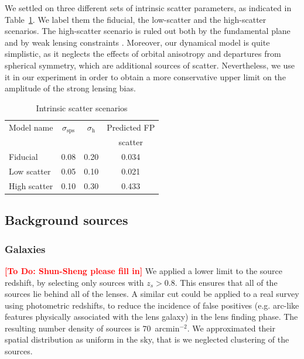 \documentclass{aa}
\def\Tref#1{Table~\ref{#1}\xspace}
\newcommand{\ale}[1]{\textcolor{red}{\textbf{[Ale: #1]}}}
\newcommand{\todo}[1]{\textcolor{red}{\textbf{[To Do: #1]}}}
\begin{document}
We settled on three different sets of intrinsic scatter parameters, as indicated in \Tref{tab:scatter}. We label them the fiducial, the low-scatter and the high-scatter scenarios.
The high-scatter scenario is ruled out both by the fundamental plane and by weak lensing constraints \citep{Son++22}. 
Moreover, our dynamical model is quite simplistic, as it neglects the effects of orbital anisotropy and departures from spherical symmetry, which are additional sources of scatter. 
Nevertheless, we use it in our experiment in order to obtain a more conservative upper limit on the amplitude of the strong lensing bias.
\begin{table}
\caption{Intrinsic scatter scenarios}
\label{tab:scatter}
\begin{tabular}{lccc}
\hline
\hline
Model name & $\sigma_{\mathrm{sps}}$ & $\sigma_{\mathrm{h}}$ & Predicted FP \\
 & & & scatter \\
\hline
Fiducial & 0.08 & 0.20 & 0.034 \\
Low scatter & 0.05 & 0.10 & 0.021 \\
High scatter & 0.10 & 0.30 & 0.433 \\
\end{tabular}
\end{table}

\subsection{Background sources}\label{ssec:sources}

\subsubsection{Galaxies}\label{ssub:extsources}

\todo{Shun-Sheng please fill in}
We applied a lower limit to the source redshift, by selecting only sources with $z_s > 0.8$.
This ensures that all of the sources lie behind all of the lenses.
A similar cut could be applied to a real survey using photometric redshifts, to reduce the incidence of false positives (e.g. arc-like features physically associated with the lens galaxy) in the lens finding phase.
The resulting number density of sources is $70$~arcmin$^{-2}$.
We approximated their spatial distribution as uniform in the sky, that is we neglected clustering of the sources.
\end{document}
